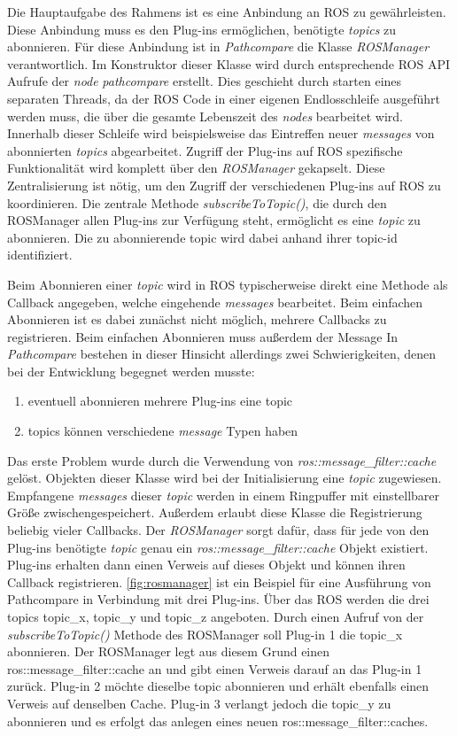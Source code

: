 Die Hauptaufgabe des Rahmens ist es eine Anbindung an ROS zu gewährleisten.
Diese Anbindung muss es den Plug-ins ermöglichen, benötigte \textit{topics} zu
abonnieren. Für diese Anbindung ist in \textit{Pathcompare} die Klasse
\textit{ROSManager} verantwortlich. Im Konstruktor dieser Klasse wird durch
entsprechende ROS API Aufrufe der \textit{node} \textit{pathcompare}
erstellt. Dies geschieht durch starten eines separaten Threads, da der ROS Code
in einer eigenen Endlosschleife ausgeführt werden muss, die über die gesamte
Lebenszeit des \textit{nodes} bearbeitet wird. Innerhalb dieser Schleife wird
beispielsweise das Eintreffen neuer \textit{messages} von abonnierten
\textit{topics} abgearbeitet.
Zugriff der Plug-ins auf ROS spezifische Funktionalität wird komplett über den
\textit{ROSManager} gekapselt. Diese Zentralisierung ist nötig, um den Zugriff
der verschiedenen Plug-ins auf ROS zu koordinieren. 
Die zentrale Methode \textit{subscribeToTopic()}, die durch den ROSManager
allen Plug-ins zur Verfügung steht, ermöglicht es eine 
\textit{topic} zu abonnieren. Die zu abonnierende topic wird dabei anhand ihrer
topic-id identifiziert.


Beim Abonnieren einer \textit{topic} wird in ROS typischerweise direkt eine
Methode als Callback angegeben, welche eingehende \textit{messages} bearbeitet.
Beim einfachen Abonnieren ist es dabei zunächst nicht möglich, mehrere
Callbacks zu registrieren. Beim einfachen Abonnieren muss außerdem der Message
In \textit{Pathcompare} bestehen in dieser Hinsicht allerdings zwei
Schwierigkeiten, denen bei der Entwicklung begegnet werden musste:

\begin{enumerate}
  \item eventuell abonnieren mehrere Plug-ins eine topic
  \item topics können verschiedene \textit{message} Typen haben
\end{enumerate}

Das erste Problem wurde durch die Verwendung von
\textit{ros::message\_filter::cache} gelöst. Objekten dieser Klasse wird bei der
Initialisierung eine \textit{topic} zugewiesen. Empfangene \textit{messages}
dieser \textit{topic} werden in einem Ringpuffer mit einstellbarer Größe
zwischengespeichert.  Außerdem erlaubt diese Klasse die Registrierung beliebig
vieler Callbacks.  Der \textit{ROSManager} sorgt dafür, dass für jede von
den Plug-ins benötigte \textit{topic} genau ein
\textit{ros::message\_filter::cache} Objekt existiert. Plug-ins erhalten dann
einen Verweis auf dieses Objekt und können ihren Callback registrieren.
\autoref{fig:rosmanager} ist ein Beispiel für eine Ausführung von Pathcompare
in Verbindung mit drei Plug-ins. Über das ROS werden die drei topics topic\_x,
topic\_y und topic\_z angeboten. Durch einen Aufruf von der
\textit{subscribeToTopic()} Methode
des ROSManager soll Plug-in 1 die topic\_x abonnieren. Der ROSManager legt aus
diesem Grund einen ros::message\_filter::cache an und gibt einen Verweis darauf
an das Plug-in 1 zurück.
Plug-in 2 möchte dieselbe topic abonnieren und erhält ebenfalls einen
Verweis auf denselben Cache. Plug-in 3 verlangt jedoch die topic\_y zu
abonnieren und es erfolgt das anlegen eines neuen ros::message\_filter::caches. 

